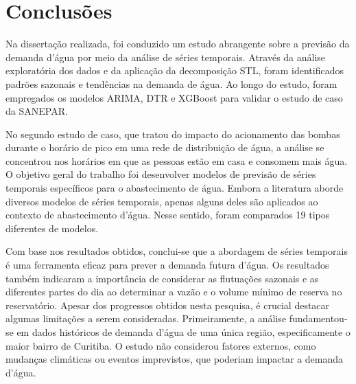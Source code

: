 \section{Conclus\~oes} \label{sec:conclusoes}

Na dissertação realizada, foi conduzido um estudo abrangente sobre a previsão da demanda d'água por meio da análise de séries temporais. Através da análise exploratória dos dados e da aplicação da decomposição STL, foram identificados padrões sazonais e tendências na demanda de água.
Ao longo do estudo, foram empregados os modelos ARIMA, DTR e XGBoost para validar o estudo de caso da SANEPAR.

No segundo estudo de caso, que tratou do impacto do acionamento das bombas durante o horário de pico em uma rede de distribuição de água, a análise se concentrou nos horários em que as pessoas estão em casa e consomem mais água.
O objetivo geral do trabalho foi desenvolver modelos de previsão de séries temporais específicos para o abastecimento de água. Embora a literatura aborde diversos modelos de séries temporais, apenas alguns deles são aplicados ao contexto de abastecimento d'água. Nesse sentido, foram comparados 19 tipos diferentes de modelos.

Com base nos resultados obtidos, conclui-se que a abordagem de séries temporais é uma ferramenta eficaz para prever a demanda futura d'água. Os resultados também indicaram a importância de considerar as flutuações sazonais e as diferentes partes do dia ao determinar a vazão e o volume mínimo de reserva no reservatório.
Apesar dos progressos obtidos nesta pesquisa, é crucial destacar algumas limitações a serem consideradas. Primeiramente, a análise fundamentou-se em dados históricos de demanda d'água de uma única região, especificamente o maior bairro de Curitiba. O estudo não considerou fatores externos, como mudanças climáticas ou eventos imprevistos, que poderiam impactar a demanda d'água.





